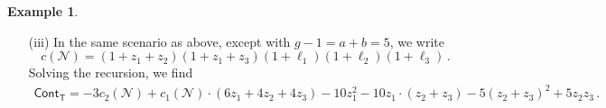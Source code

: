 \documentclass[11pt]{amsart}
\theoremstyle{definition}
\newtheorem{example}[thm]{Example}
\newcommand{\N}{\mathcal{N}}
\begin{document}
{\begin{example}
\begin{itemize}
\[\]
Expanding the two power series and dividing through by $z_1z_2z_3$, we obtain
\[
\mathsf{Cont}_{\mathsf{T}}=z_2+z_3-3\ell_1-3\ell_2=-3c_1(\N)+6z_1+4z_2+4z_3\,.%
\]
\item [(iii)]
In the same scenario as above, except with $g-1=a+b=5$, we write 
$$c(\mathcal N)=(1+z_1+z_2)(1+z_1+z_3)(1+\ell_1)(1+\ell_2)(1+\ell_3)\,.$$ 
Solving the recursion, we find
\begin{align*}
\mathsf{Cont}_{\mathsf{T}}%
=-3c_2(\mathcal N)+c_1(\mathcal N)\cdot (6z_1+4z_2+4z_3)-10z_1^2-10 z_1\cdot (z_2+z_3)-5(z_2+z_3)^2+5z_2z_3\,.
\end{align*}
\end{itemize}
\end{example}  

}
\end{document}
